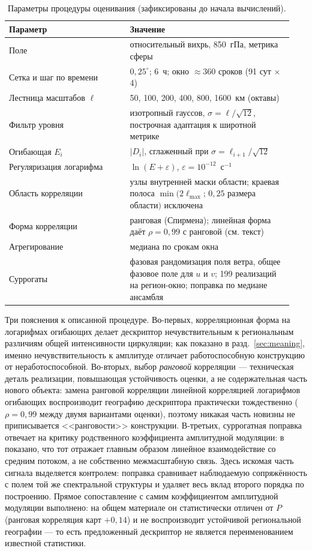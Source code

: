 \documentclass[11pt,a4paper]{article}
\begin{document}
\begin{table}[H]
\centering
\caption{Параметры процедуры оценивания (зафиксированы до начала вычислений).}
\label{tab:params}
\small
\begin{tabular}{@{}p{0.40\linewidth}p{0.54\linewidth}@{}}
\toprule
Параметр & Значение\\
\midrule
Поле & относительный вихрь, 850~гПа, метрика сферы\\
Сетка и шаг по времени & $0{,}25^\circ$; 6~ч; окно $\approx$360 сроков (91 сут $\times$ 4)\\
Лестница масштабов $\ell$ & 50, 100, 200, 400, 800, 1600~км (октавы)\\
Фильтр уровня & изотропный гауссов, $\sigma=\ell/\sqrt{12}$, построчная адаптация к широтной метрике\\
Огибающая $E_i$ & $\lvert D_i\rvert$, сглаженный при $\sigma=\ell_{i+1}/\sqrt{12}$\\
Регуляризация логарифма & $\ln(E+\varepsilon)$, $\varepsilon=10^{-12}$~с$^{-1}$\\
Область корреляции & узлы внутренней маски области; краевая полоса $\min(2\ell_{\max};\,0{,}25$ размера области$)$ исключена\\
Форма корреляции & ранговая (Спирмена); линейная форма даёт $\rho=0{,}99$ с ранговой (см. текст)\\
Агрегирование & медиана по срокам окна\\
Суррогаты & фазовая рандомизация поля ветра, общее фазовое поле для $u$ и $v$; 199 реализаций на регион-окно; поправка по медиане ансамбля\\
\bottomrule
\end{tabular}
\end{table}

Три пояснения к описанной процедуре. Во-первых, корреляционная форма на логарифмах огибающих делает дескриптор нечувствительным к региональным различиям общей интенсивности циркуляции; как показано в разд.~\ref{sec:meaning}, именно нечувствительность к амплитуде отличает работоспособную конструкцию от неработоспособной. Во-вторых, выбор \emph{ранговой} корреляции --- техническая деталь реализации, повышающая устойчивость оценки, а не содержательная часть нового объекта: замена ранговой корреляции линейной корреляцией логарифмов огибающих воспроизводит географию дескриптора практически тождественно ($\rho=0{,}99$ между двумя вариантами оценки), поэтому никакая часть новизны не приписывается <<ранговости>> конструкции. В-третьих, суррогатная поправка отвечает на критику родственного коэффициента амплитудной модуляции: в \cite{CuiJacobi2025} показано, что тот отражает главным образом линейное взаимодействие со средним потоком, а не собственно межмасштабную связь. Здесь искомая часть сигнала выделяется контролем: поправка сравнивает наблюдаемую сопряжённость с полем той же спектральной структуры и удаляет весь вклад второго порядка по построению. Прямое сопоставление с самим коэффициентом амплитудной модуляции выполнено: на общем материале он статистически отличен от $P$ (ранговая корреляция карт $+0{,}14$) и не воспроизводит устойчивой региональной географии --- то есть предложенный дескриптор не является переименованием известной статистики.
\end{document}
